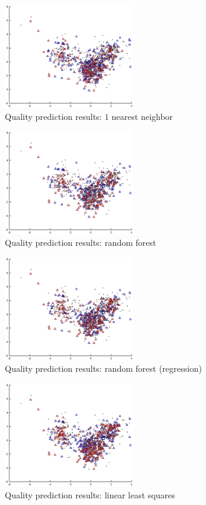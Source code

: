 \documentclass[twoside]{article}
\begin{document}
\begin{multicols}{2}
\begin{figure}[H]
\centering
\includegraphics[width=0.5\textwidth]{rankpca/knn1}
\caption{Quality prediction results: $1$ nearest neighbor}
\end{figure}

\begin{figure}[H]
\centering
\includegraphics[width=0.5\textwidth]{rankpca/randomforest}
\caption{Quality prediction results: random forest}
\end{figure}

\begin{figure}[H]
\centering
\includegraphics[width=0.5\textwidth]{rankpca/randomforestreg}
\caption{Quality prediction results: random forest (regression)}
\end{figure}

\begin{figure}[H]
\centering
\includegraphics[width=0.5\textwidth]{rankpca/ols}
\caption{Quality prediction results: linear least squares}
\end{figure}


\end{multicols}
\end{document}
